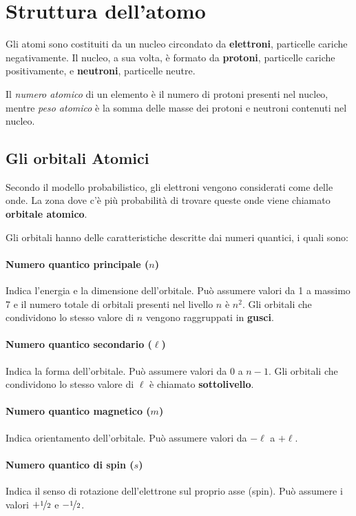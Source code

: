 \section{Struttura dell'atomo}
Gli atomi sono costituiti da un nucleo circondato da \textbf{elettroni}, particelle cariche negativamente. Il nucleo, a sua volta, è formato da \textbf{protoni}, particelle cariche positivamente, e \textbf{neutroni}, particelle neutre.

Il \textit{numero atomico} di un elemento è il numero di protoni presenti nel nucleo, mentre \textit{peso atomico} è la somma delle masse dei protoni e neutroni contenuti nel nucleo.

\subsection{Gli orbitali Atomici}
Secondo il modello probabilistico, gli elettroni vengono considerati come delle onde. La zona dove c'è più probabilità di trovare queste onde viene chiamato \textbf{orbitale atomico}.

Gli orbitali hanno delle caratteristiche descritte dai numeri quantici, i quali sono:
\paragraph{Numero quantico principale (\(n\))} Indica l'energia e la dimensione dell'orbitale. Può assumere valori da 1 a massimo 7 e il numero totale di orbitali presenti nel livello \(n\) è \(n^2\). Gli orbitali che condividono lo stesso valore di \(n\) vengono raggruppati in \textbf{gusci}.
\paragraph{Numero quantico secondario (\(\ell\))} Indica la forma dell'orbitale. Può assumere valori da 0 a \(n-1\). Gli orbitali che condividono lo stesso valore di \(\ell\) è chiamato \textbf{sottolivello}.
\paragraph{Numero quantico magnetico (\(m\))} Indica orientamento dell'orbitale. Può assumere valori da \(-\ell\) a \(+\ell\).
\paragraph{Numero quantico di spin (\(s\))} Indica il senso di rotazione dell'elettrone sul proprio asse (spin). Può assumere i valori \(+\nicefrac{1}{2}\) e \(-\nicefrac{1}{2}\).

